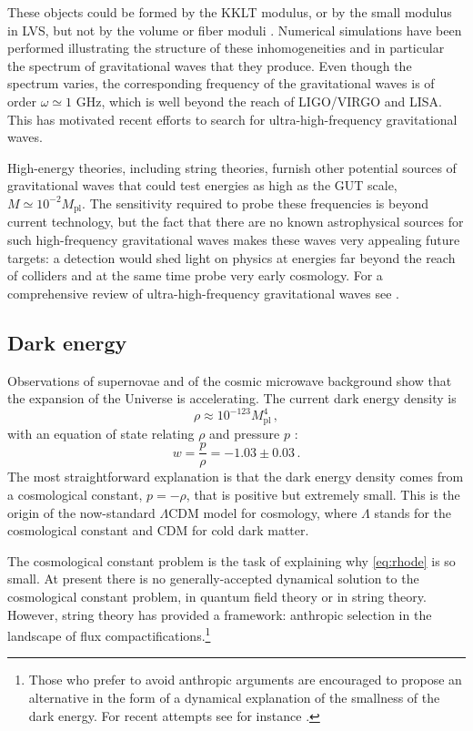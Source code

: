 \documentclass[12pt,a4wide]{article}
\def\be{\begin{equation}}
\def\ee{\end{equation}}
\begin{document}
\begin{itemize}
    These objects could be formed by the KKLT modulus, or by the small modulus in LVS, but not by the volume or fiber moduli \cite{Antusch:2017flz, Krippendorf:2018tei}. Numerical simulations have been performed illustrating the structure of these inhomogeneities and in particular the spectrum of gravitational waves that they produce. Even though the spectrum varies, the corresponding frequency of the gravitational waves is of order $\omega \simeq 1$ GHz, which is well beyond the reach of LIGO/VIRGO and LISA. This has motivated recent efforts to search 
    for ultra-high-frequency gravitational waves. 

    
    High-energy theories, including string theories, furnish other potential sources of gravitational waves that could test energies as high as the GUT scale, $M\simeq 10^{-2} M_{\text{pl}}$. 
    The sensitivity required to probe these frequencies is beyond current technology, but the fact that there are no known astrophysical sources for such high-frequency gravitational waves 
    makes these waves very appealing future targets: a detection would shed light on physics at energies far beyond the reach of colliders and at the same time probe very early cosmology. For a comprehensive review of ultra-high-frequency gravitational waves see \cite{Aggarwal:2020olq}. 
    
\end{itemize}

\subsection{Dark energy}

Observations of supernovae and of the cosmic microwave background show 
that the expansion of the Universe is accelerating.
The current dark energy density is 
\begin{equation}\label{eq:rhode}
    \rho \approx 10^{-123} M_{\text{pl}}^4\,,
\end{equation}
with an equation of state relating $\rho$ and pressure $p$ \cite{Planck:2018vyg}:
\be
w=\frac{p}{\rho}=-1.03 \pm 0.03\,.
\ee
The most straightforward explanation is that the dark energy density comes from a cosmological constant,  $p=-\rho$, that is positive but extremely small.
This is the origin of the now-standard $\Lambda$CDM model for cosmology, where $\Lambda$ stands for the cosmological constant and CDM for cold dark matter.

The cosmological constant problem is the task of explaining why \eqref{eq:rhode} is so small.
At present there is no generally-accepted dynamical solution to the cosmological constant problem, in quantum field theory or in string theory.
However, string theory has provided a framework:
anthropic selection in the landscape of flux compactifications.\footnote{Those who prefer to avoid anthropic arguments are encouraged to propose an alternative in the form of a dynamical explanation of the smallness of the dark energy. For recent attempts see for instance \cite{Kaloper:2023xfl,Burgess:2021obw}.}
 
\end{document}
